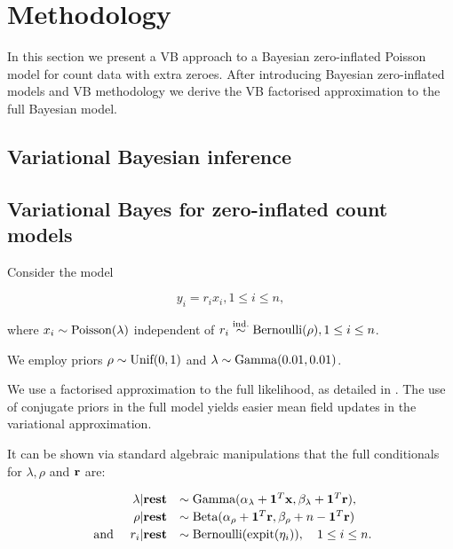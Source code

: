 \documentclass{article}[12pt]
\begin{document}
\section{Methodology}\label{sec:methodology}

In this section we present a VB approach to a Bayesian zero-inflated Poisson model
for count data with extra zeroes. After introducing Bayesian zero-inflated models
and VB methodology we derive the VB factorised approximation to the full Bayesian
model. 

\subsection{Variational Bayesian inference}

\subsection{Variational Bayes for zero-inflated count models}

\noindent Consider the model

$$
y_i = r_i x_i, 1 \leq i \leq n,
$$

\noindent where $x_i \sim \text{Poisson} (\lambda)$ independent of $r_i \stackrel{\text{ind.}}{\sim} \text{Bernoulli} (\rho), 1 \leq i \leq n$.

We employ priors $\rho \sim \text{Unif} (0, 1)$ and
$\lambda \sim \text{Gamma} (0.01, 0.01)$. 
 

  We use a factorised approximation to the full likelihood, as detailed in \citep{ormerod10}.
The use of conjugate priors in the full model yields easier mean field updates in the
variational approximation.

  It can be shown via standard algebraic manipulations that the
full conditionals for $\lambda, \rho$ and ${\bf r}$ are:

$$
\begin{array}{rl}
\lambda | \textbf{rest} &\sim \text{Gamma} (\alpha_\lambda + {\bf 1}^T{\bf x}, \beta_\lambda + {\bf 1}^T{\bf r}), \\ [0.5ex]
\rho | \textbf{rest} &\sim \text{Beta} (\alpha_\rho + {\bf 1}^T {\bf r}, \beta_\rho + n - {\bf 1}^T{\bf r}) \\ [0.5ex]
\mbox{ and } \quad r_i | \textbf{rest} &\sim \text{Bernoulli} (\text{expit}(\eta_i)), \quad 1 \leq i \leq n.
\end{array}
$$

\end{document}
